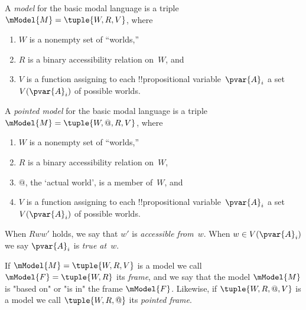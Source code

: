 \documentclass[../../../../include/open-logic-section]{subfiles}
\begin{document}



\begin{defn}[Models]
    A \emph{model} for the basic modal language is a triple $\mModel{M}
    = \tuple{W, R, V}$, where
    \begin{enumerate}
    \item $W$ is a nonempty set of ``worlds,''
    \item $R$ is a binary accessibility relation on~$W$, and
    \item $V$ is a function assigning to each !!{propositional
      variable}~$\pvar{A}_i$ a set $V(\pvar{A}_i)$ of possible worlds.
    \end{enumerate}
\end{defn}

\begin{defn}
    A \emph{pointed model} for the basic modal language is a triple
    $\mModel{M} = \tuple{W, @, R, V}$, where
    \begin{enumerate}
    \item $W$ is a nonempty set of ``worlds,''
    \item $R$ is a binary accessibility relation on~$W$,
    \item $@$, the `actual world', is a member of~$W$, and
    \item $V$ is a function assigning to each !!{propositional
      variable}~$\pvar{A}_i$ a set $V(\pvar{A}_i)$ of possible worlds.
    \end{enumerate}
\end{defn}

When $Rww'$ holds, we say that $w'$ is \emph{accessible
from}~$w$. When $w \in V(\pvar{A}_i)$ we say $\pvar{A}_i$ is \emph{true at}~$w$.

\begin{defn}[Frames]
If $\mModel{M}=\tuple{W, R, V}$ is a model we call
$\mModel{F}=\tuple{W, R}$ its \emph{frame}, and we say that the model
$\mModel{M}$ is "based on" or "is in" the frame $\mModel{F}$. Likewise,
if $\tuple{W, R, @, V}$ is a model we call $\tuple{W, R, @}$ its
\emph{pointed frame}.
\end{defn}
\end{document}
